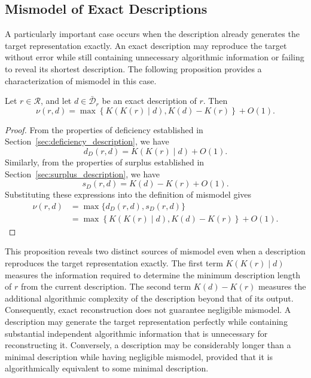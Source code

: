 
\subsection*{Mismodel of Exact Descriptions}

A particularly important case occurs when the description already generates the target representation exactly. An exact description may reproduce the target without error while still containing unnecessary algorithmic information or failing to reveal its shortest description. The following proposition provides a characterization of mismodel in this case.

\begin{proposition}
\label{prop:mismodel_exact_description}
Let $r\in\mathcal R$, and let $d\in\bar{\mathcal D}_r$ be an exact description of $r$. Then
\[
\nu(r,d) = \max\left\{ K(K(r)\mid d), K(d)-K(r) \right\} + O(1).
\]
\end{proposition}
\begin{proof}
From the properties of deficiency established in Section~\ref{sec:deficiency_description}, we have
\[
d_D(r,d)=K(K(r)\mid d)+O(1).
\]
Similarly, from the properties of surplus established in Section~\ref{sec:surplus_description}, we have
\[
s_D(r,d)=K(d)-K(r)+O(1).
\] 
Substituting these expressions into the definition of mismodel gives
\[
\begin{aligned}
\nu(r,d)
& = \max\{d_D(r,d),s_D(r,d)\}\\
& = \max\left\{K(K(r)\mid d), K(d)-K(r) \right\} + O(1).
\end{aligned}
\]
\end{proof}

This proposition reveals two distinct sources of mismodel even when a description reproduces the target representation exactly. The first term $K(K(r)\mid d)$ measures the information required to determine the minimum description length of $r$ from the current description. The second term $K(d)-K(r)$ measures the additional algorithmic complexity of the description beyond that of its output. Consequently, exact reconstruction does not guarantee negligible mismodel. A description may generate the target representation perfectly while containing substantial independent algorithmic information that is unnecessary for reconstructing it. Conversely, a description may be considerably longer than a minimal description while having
negligible mismodel, provided that it is algorithmically equivalent to some minimal description.

